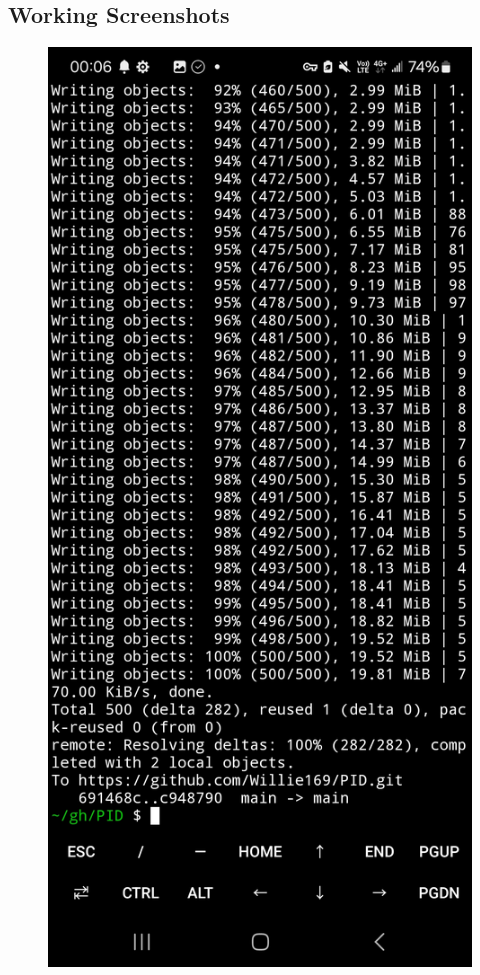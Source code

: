 \documentclass[a4paper,12pt]{./article}
\begin{document}
\subsection{Working Screenshots}
\begin{center}\begin{figure}[H]\centering
\hfill
\begin{minipage}[t]{./0.45\textwidth}
\centering
\includegraphics[width=\textwidth]{./working_screenshots/1.jpg}

\end{minipage}
\end{figure}
\end{center}
\end{document}
